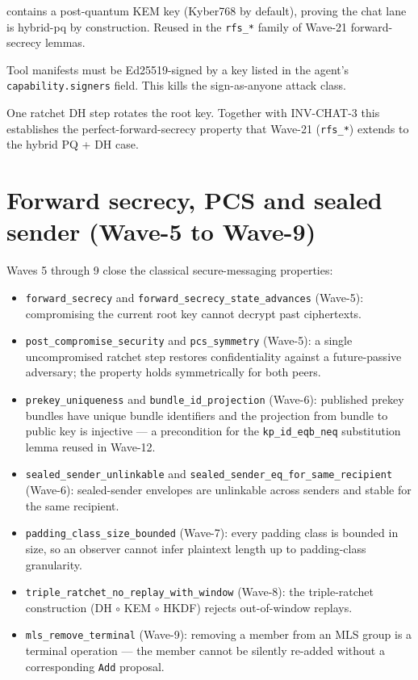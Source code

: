 \begin{description}
        contains a post-quantum KEM key (Kyber768 by default), proving
        the chat lane is hybrid-pq by construction. Reused in the
        \texttt{rfs\_*} family of Wave-21 forward-secrecy lemmas.
  \item[INV-CHAT-7 \texttt{signed\_tool\_only}.] Tool manifests must
        be Ed25519-signed by a key listed in the agent's
        \texttt{capability.signers} field. This kills the
        sign-as-anyone attack class.
  \item[INV-CHAT-8 \texttt{ratchet\_dh\_step\_rotates\_root}.] One
        ratchet DH step rotates the root key. Together with INV-CHAT-3
        this establishes the perfect-forward-secrecy property that
        Wave-21 (\texttt{rfs\_*}) extends to the hybrid PQ + DH case.
\end{description}

\section{Forward secrecy, PCS and sealed sender (Wave-5 to Wave-9)}
\label{sec:chat:fs-pcs-ss}

Waves 5 through 9 close the classical secure-messaging properties:

\begin{itemize}
  \item \texttt{forward\_secrecy} and
        \texttt{forward\_secrecy\_state\_advances} (Wave-5):
        compromising the current root key cannot decrypt past
        ciphertexts.
  \item \texttt{post\_compromise\_security} and \texttt{pcs\_symmetry}
        (Wave-5): a single uncompromised ratchet step restores
        confidentiality against a future-passive adversary; the property
        holds symmetrically for both peers.
  \item \texttt{prekey\_uniqueness} and \texttt{bundle\_id\_projection}
        (Wave-6): published prekey bundles have unique bundle identifiers
        and the projection from bundle to public key is injective ---
        a precondition for the \texttt{kp\_id\_eqb\_neq} substitution
        lemma reused in Wave-12.
  \item \texttt{sealed\_sender\_unlinkable} and
        \texttt{sealed\_sender\_eq\_for\_same\_recipient} (Wave-6):
        sealed-sender envelopes are unlinkable across senders and stable
        for the same recipient.
  \item \texttt{padding\_class\_size\_bounded} (Wave-7):
        every padding class is bounded in size, so an observer cannot
        infer plaintext length up to padding-class granularity.
  \item \texttt{triple\_ratchet\_no\_replay\_with\_window} (Wave-8):
        the triple-ratchet construction (DH $\circ$ KEM $\circ$ HKDF)
        rejects out-of-window replays.
  \item \texttt{mls\_remove\_terminal} (Wave-9): removing a member
        from an MLS group is a terminal operation --- the member cannot
        be silently re-added without a corresponding \texttt{Add}
        proposal.
\end{itemize}

